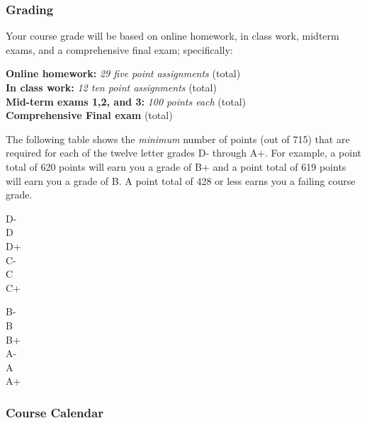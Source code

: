 \documentclass[12pt]{article}
\newcounter{ex}\setcounter{ex}{0}
\newenvironment{mypar}[2]
  {\begin{list}{}%
    {\setlength\leftmargin{#1}
    \setlength\rightmargin{#2}}
    \item[]}
  {\end{list}}
\begin{document}
\subsubsection*{Grading}

Your course grade will be based on online homework, in class work, midterm exams, and a comprehensive 
final exam; specifically:
\begin{mypar}{0.25in}{0.25in}
    \textbf{Online homework:} \emph{29 five point assignments}  (total)\\
    \textbf{In class work:}  \emph{12 ten point assignments}   (total) \\
    \textbf{Mid-term exams 1,2, and 3:} \emph{100 points each}  (total)\\
      \textbf{Comprehensive Final exam}  (total)\\
\end{mypar}
\noindent The following table shows the \emph{minimum} number of points (out of 715) that
are required for each of the twelve letter grades D- through A+. For
example, a point total of 620 points will earn you a grade of B+ and 
a point total of 619 points will earn you a grade of B. A point
total of 428 or less earns you a failing course grade.
\begin{mypar}{0.25in}{0.25in}
    \begin{minipage}{2.5in}
        D-    \\
        D  \\
        D+  \\
        C-  \\
        C  \\
        C+  
    \end{minipage}
    \phantom{xxx}
    \begin{minipage}{2.5in}
        B-  \\
        B  \\
        B+  \\
        A-   \\
        A  \\
        A+  
    \end{minipage}
\end{mypar} 

\subsubsection*{Course Calendar}
\end{document}

